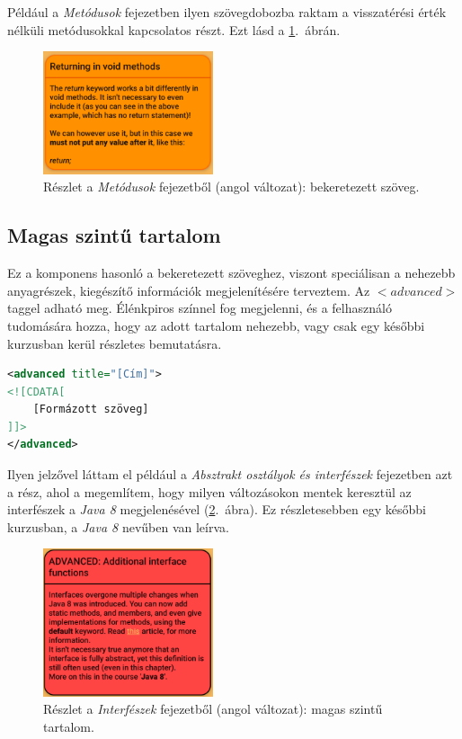 \documentclass[12pt,a4paper]{article}
\begin{document}
	Például a \textit{Metódusok} fejezetben ilyen szövegdobozba raktam a visszatérési érték nélküli metódusokkal kapcsolatos részt. Ezt lásd a \ref{boxed_component_figure}.\ ábrán.
	
	\begin{figure}[h!]
		\centering
		\includegraphics[width=5cm]{boxed_component}
		\caption{Részlet a \textit{Metódusok} fejezetből (angol változat): bekeretezett szöveg.}
		\label{boxed_component_figure}
	\end{figure}
	
	\subsection{Magas szintű tartalom}
	
	Ez a komponens hasonló a bekeretezett szöveghez, viszont speciálisan a nehezebb anyagrészek, kiegészítő információk megjelenítésére terveztem. Az $<advanced>$ taggel adható meg. Élénkpiros színnel fog megjelenni, és a felhasználó tudomására hozza, hogy az adott tartalom nehezebb, vagy csak egy későbbi kurzusban kerül részletes bemutatásra.
	
	\bigskip
	\begin{lstlisting}[language=XML]
<advanced title="[Cím]">
<![CDATA[
	[Formázott szöveg]
]]>
</advanced>	
	\end{lstlisting}
	\bigskip
	
	Ilyen jelzővel láttam el például a \textit{Absztrakt osztályok és interfészek} fejezetben azt a rész, ahol a megemlítem, hogy milyen változásokon mentek keresztül az interfészek a \textit{Java 8} megjelenésével (\ref{advanced_component_figure}.\ ábra). Ez részletesebben egy későbbi kurzusban, a \textit{Java 8} nevűben van leírva.
	
	\begin{figure}[h!]
		\centering
		\includegraphics[width=5cm]{advanced_component}
		\caption{Részlet a \textit{Interfészek} fejezetből (angol változat): magas szintű tartalom.}
		\label{advanced_component_figure}
	\end{figure}
	
\end{document}
